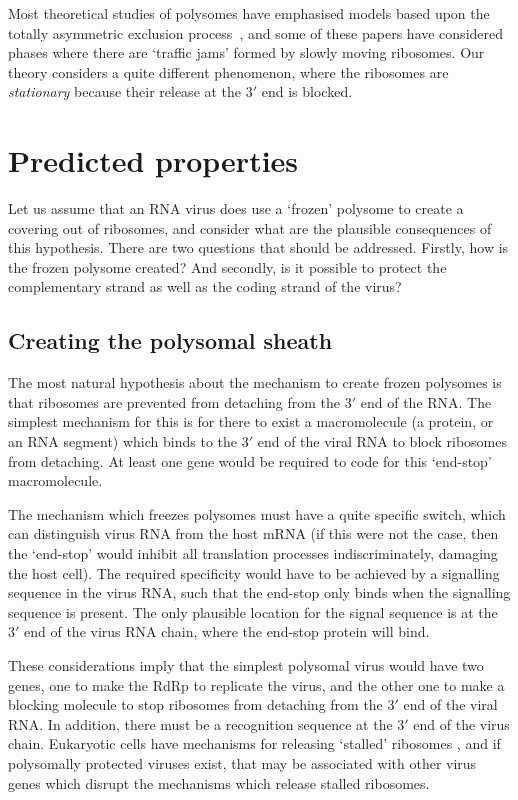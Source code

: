 \documentclass[12pt]{iopart}
\begin{document}
Most theoretical studies of polysomes have emphasised models based upon the totally 
asymmetric exclusion process~\cite{Lakatos2003,Lakatos2004,Lakatos2005,DaoDuc2018,Erdmann2020}, 
and some of these papers have considered phases where there are \lq traffic jams' formed by slowly 
moving ribosomes. Our theory considers a quite different phenomenon, where the ribosomes are \emph{stationary} 
because their release at the $3'$ end is blocked.

\section{Predicted properties}
\label{sec: 2}

Let us assume that an RNA virus does use a \lq frozen' polysome to create a 
covering out of ribosomes, and consider what are the plausible consequences of this hypothesis.
There are two questions that should be addressed. Firstly, how is the frozen polysome
created? And secondly, is it possible to protect the complementary strand as well as the 
coding strand of the virus?

\subsection{Creating the polysomal sheath}
\label{sec: 2.1}

The most natural hypothesis about the mechanism to create frozen polysomes 
is that ribosomes are prevented from detaching from the $3'$ end of the RNA.
The simplest mechanism for this is for there to exist a macromolecule (a protein, or an RNA segment) 
which binds to the $3'$ end of the viral RNA to block ribosomes from detaching. 
At least one gene would be required to code for this \lq end-stop' macromolecule.

The mechanism which freezes polysomes must have a quite 
specific switch, which can distinguish virus RNA from the host mRNA (if this were 
not the case, then the \lq end-stop' would inhibit all translation processes indiscriminately, 
damaging the host cell). The required specificity would have to be achieved by a signalling 
sequence in the virus RNA, such that the end-stop only binds when the signalling 
sequence is present. The only plausible location for the signal sequence is at the $3'$ end of the virus 
RNA chain, where the end-stop protein will bind.

These considerations imply that the simplest polysomal virus would have two genes, 
one to make the RdRp to replicate the virus, and the other one to make a blocking 
molecule to stop ribosomes from detaching from the $3'$ end of the viral RNA. In addition, there
must be a recognition sequence at the $3'$ end of the virus chain. Eukaryotic cells 
have mechanisms for releasing \lq stalled' ribosomes \cite{Joa17,Mat+17,Ren+18,Jus+18,Nav+20},
and if polysomally protected viruses exist, that may be associated with other virus genes 
which disrupt the mechanisms which release stalled ribosomes.
\end{document}
